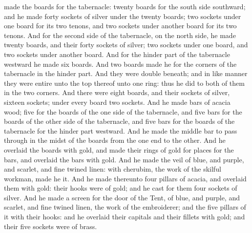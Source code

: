 made the boards for the tabernacle: twenty boards for the south side southward; and he made forty sockets of silver under the twenty boards; two sockets under one board for its two tenons, and two sockets under another board for its two tenons. And for the second side of the tabernacle, on the north side, he made twenty boards, and their forty sockets of silver; two sockets under one board, and two sockets under another board. And for the hinder part of the tabernacle westward he made six boards. And two boards made he for the corners of the tabernacle in the hinder part. And they were double beneath; and in like manner they were entire unto the top thereof unto one ring: thus he did to both of them in the two corners. And there were eight boards, and their sockets of silver, sixteen sockets; under every board two sockets.  And he made bars of acacia wood; five for the boards of the one side of the tabernacle, and five bars for the boards of the other side of the tabernacle, and five bars for the boards of the tabernacle for the hinder part westward. And he made the middle bar to pass through in the midst of the boards from the one end to the other. And he overlaid the boards with gold, and made their rings of gold for places for the bars, and overlaid the bars with gold.  And he made the veil of blue, and purple, and scarlet, and fine twined linen: with cherubim, the work of the skilful workman, made he it. And he made thereunto four pillars of acacia, and overlaid them with gold: their hooks were of gold; and he cast for them four sockets of silver. And he made a screen for the door of the Tent, of blue, and purple, and scarlet, and fine twined linen, the work of the embroiderer; and the five pillars of it with their hooks: and he overlaid their capitals and their fillets with gold; and their five sockets were of brass. 

